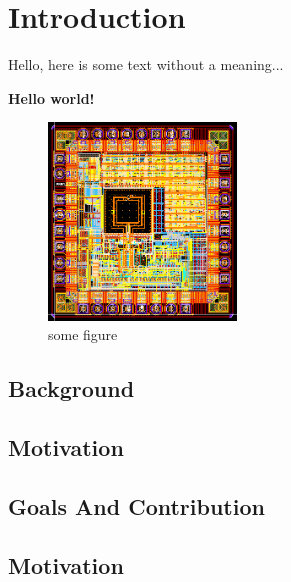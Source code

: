 \documentclass[../main.tex]{subfiles}
\begin{document}
\chapter{Introduction}
Hello, here is some text without a meaning...\cite{salemi2013uvm}

\textbf{Hello world!}

\begin{figure}[bh]
\centering
\includegraphics[width=5cm]{diagrams/MPW2Naretlayout.png}

\label{fig:img1}
\caption{some figure}
\end{figure}

\section{Background}
\blindtext[6]

\section{Motivation}
\blindtext[3]

\section{Goals And Contribution}
\blindtext[3]

\section{Motivation}
\blindtext[3]
\end{document}
